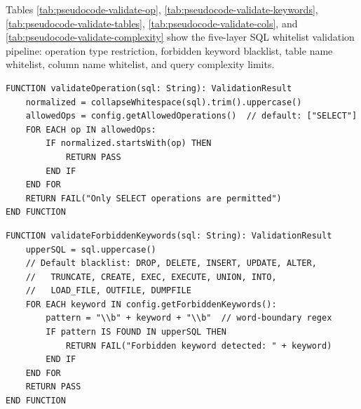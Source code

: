 Tables \ref{tab:pseudocode-validate-op}, \ref{tab:pseudocode-validate-keywords}, \ref{tab:pseudocode-validate-tables}, \ref{tab:pseudocode-validate-cols}, and \ref{tab:pseudocode-validate-complexity} show the five-layer SQL whitelist validation pipeline: operation type restriction, forbidden keyword blacklist, table name whitelist, column  name whitelist, and query complexity limits.

\vspace{3mm}

\begin{table}[H]
\small\singlespacing
\centering
\caption{Pseudocode --- validateOperation() SQL Operation Type Check (Layer 1)}
\label{tab:pseudocode-validate-op}
\vspace{2mm}

\begin{lstlisting}
FUNCTION validateOperation(sql: String): ValidationResult
    normalized = collapseWhitespace(sql).trim().uppercase()
    allowedOps = config.getAllowedOperations()  // default: ["SELECT"]
    FOR EACH op IN allowedOps:
        IF normalized.startsWith(op) THEN
            RETURN PASS
        END IF
    END FOR
    RETURN FAIL("Only SELECT operations are permitted")
END FUNCTION
\end{lstlisting}
\end{table}


\vspace{3mm}

\begin{table}[H]
\small\singlespacing
\centering
\caption{Pseudocode --- validateForbiddenKeywords() Keyword Blacklist Scan (Layer 2)}
\label{tab:pseudocode-validate-keywords}
\vspace{2mm}

\begin{lstlisting}
FUNCTION validateForbiddenKeywords(sql: String): ValidationResult
    upperSQL = sql.uppercase()
    // Default blacklist: DROP, DELETE, INSERT, UPDATE, ALTER,
    //   TRUNCATE, CREATE, EXEC, EXECUTE, UNION, INTO,
    //   LOAD_FILE, OUTFILE, DUMPFILE
    FOR EACH keyword IN config.getForbiddenKeywords():
        pattern = "\\b" + keyword + "\\b"  // word-boundary regex
        IF pattern IS FOUND IN upperSQL THEN
            RETURN FAIL("Forbidden keyword detected: " + keyword)
        END IF
    END FOR
    RETURN PASS
END FUNCTION
\end{lstlisting}
\end{table}


